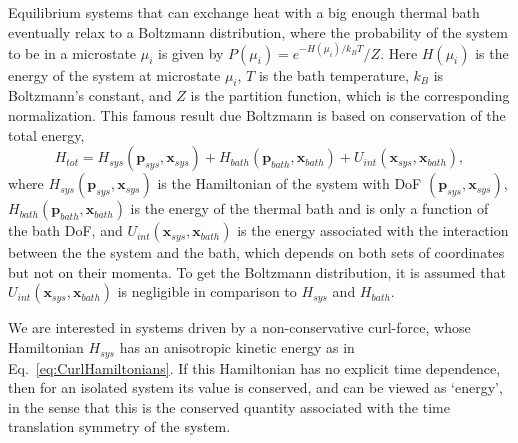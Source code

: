 Equilibrium systems that can exchange heat with a big enough thermal bath eventually relax to a Boltzmann distribution, where the probability of the system to be in a microstate $\mu_i$ is given by $P(\mu_i)=e^{-H(\mu_i)/k_B T}/Z$. Here $H(\mu_i)$ is the energy of the system at microstate $\mu_i$, $T$ is the bath temperature, $k_B$ is Boltzmann's constant, and $Z$ is the partition function, which is the corresponding normalization. This famous result due Boltzmann is based on conservation of the total energy, 
\begin{equation}\label{eq:total_energy}
    H_{tot} = H_{sys}(\mathbf p_{sys},\mathbf x_{sys})+H_{bath}(\mathbf p_{bath},\mathbf x_{bath}) +  U_{int}(\mathbf x_{sys},\mathbf x_{bath}),
\end{equation}
where $H_{sys}(\mathbf p_{sys},\mathbf x_{sys})$ is the Hamiltonian of the system with DoF $(\mathbf p_{sys},\mathbf x_{sys})$, $H_{bath}(\mathbf p_{bath},\mathbf x_{bath})$ is the energy of the thermal bath and is only a function of the bath DoF, and $U_{int}(\mathbf x_{sys},\mathbf x_{bath})$ is the energy associated with the interaction between the the system and the bath, which depends on both sets of coordinates but not on their momenta. To get the Boltzmann distribution, it is assumed that $U_{int}(\mathbf x_{sys},\mathbf x_{bath})$ is negligible in comparison to $H_{sys}$ and $H_{bath}$. 

We are interested in systems driven by a non-conservative curl-force, whose Hamiltonian $H_{sys}$ has an anisotropic kinetic energy as in Eq.~\ref{eq:CurlHamiltonians}. If this Hamiltonian has no explicit time dependence, then for an isolated system its value is conserved, and can be viewed as `energy', in the sense that this is the conserved quantity associated with the time translation symmetry of the system. 

